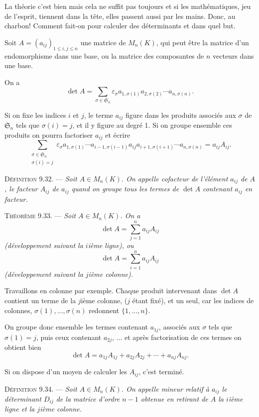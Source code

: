 

La théorie c'est bien mais cela ne suffit pas toujours et si les mathématiques, jeu de l'esprit, tiennent dans la tête, elles passent aussi par les mains. Donc, au charbon! Comment fait-on pour calculer des déterminants et dans quel but.

Soit $A=(a_{ij})_{1\le i,j\le n}$ une matrice de $M_n(K)$, qui peut être la matrice d'un endomorphisme dans une base, ou la matrice des composantes de $n$ vecteurs dans une base.

On a
\[
\det A=\sum_{\sigma\in\mathfrak S_n}\varepsilon_\sigma a_{1,\sigma(1)}a_{2,\sigma(2)}\cdots a_{n,\sigma(n)}.
\]

Si on fixe les indices $i$ et $j$, le terme $a_{ij}$ figure dans les produits associés aux $\sigma$ de $\mathfrak S_n$ tels que $\sigma(i)=j$, et il y figure au degré 1. Si on groupe ensemble ces produits on pourra factoriser $a_{ij}$ et écrire
\[
\sum_{\substack{\sigma\in\mathfrak S_n\\\sigma(i)=j}}
\varepsilon_\sigma a_{1,\sigma(1)}\cdots a_{i-1,\sigma(i-1)}a_{ij}a_{i+1,\sigma(i+1)}\cdots a_{n,\sigma(n)}
=a_{ij}A_{ij}.
\]

\medskip\noindent\textsc{Définition 9.32.} --- \emph{Soit $A\in M_n(K)$. On appelle cofacteur de l'élément $a_{ij}$ de $A$, le facteur $A_{ij}$ de $a_{ij}$ quand on groupe tous les termes de $\det A$ contenant $a_{ij}$ en facteur.}

\medskip\noindent\textsc{Théorème 9.33.} --- \emph{Soit $A\in M_n(K)$. On a}
\[
\det A=\sum_{j=1}^n a_{ij}A_{ij}
\]
\emph{(développement suivant la $i$ième ligne), ou}
\[
\det A=\sum_{i=1}^n a_{ij}A_{ij}
\]
\emph{(développement suivant la $j$ième colonne).}

Travaillons en colonne par exemple. Chaque produit intervenant dans $\det A$ contient un terme de la $j$ième colonne, ($j$ étant fixé), et un seul, car les indices de colonnes, $\sigma(1),\ldots,\sigma(n)$ redonnent $\{1,\ldots,n\}$.

On groupe donc ensemble les termes contenant $a_{1j}$, associés aux $\sigma$ tels que $\sigma(1)=j$, puis ceux contenant $a_{2j}$, ... et après factorisation de ces termes on obtient bien
\[
\det A=a_{1j}A_{1j}+a_{2j}A_{2j}+\cdots+a_{nj}A_{nj}.
\]
\bookend

Si on dispose d'un moyen de calculer les $A_{ij}$, c'est terminé.

\medskip\noindent\textsc{Définition 9.34.} --- \emph{Soit $A\in M_n(K)$. On appelle mineur relatif à $a_{ij}$ le déterminant $D_{ij}$ de la matrice d'ordre $n-1$ obtenue en retirant de $A$ la $i$ième ligne et la $j$ième colonne.}

